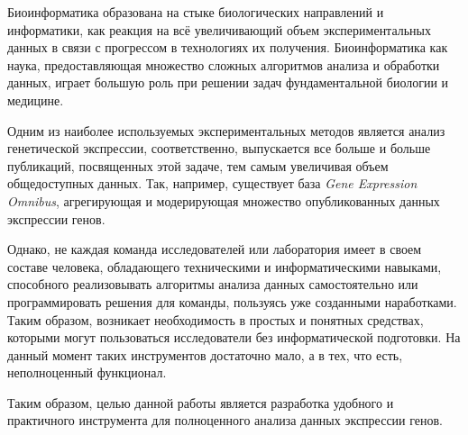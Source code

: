 \documentclass[annotation,specification]{itmo-student-thesis}
\begin{document}



\tableofcontents

\startprefacepage
Биоинформатика образована на стыке биологических направлений и информатики, как реакция на всё увеличивающий объем экспериментальных данных в связи с прогрессом в технологиях их получения. Биоинформатика как наука, предоставляющая множество сложных алгоритмов анализа и обработки данных, играет большую роль при решении задач фундаментальной биологии и медицине.

Одним из наиболее используемых экспериментальных методов является анализ генетической экспрессии, соответственно, выпускается все больше и больше публикаций, посвященных этой задаче, тем самым увеличивая объем общедоступных данных. Так, например, существует база \emph{Gene Expression Omnibus}, агрегирующая и модерирующая множество опубликованных данных экспрессии генов.

Однако, не каждая команда исследователей или лаборатория имеет в своем составе человека, обладающего техническими и информатическими навыками, способного реализовывать алгоритмы анализа данных самостоятельно или программировать решения для команды, пользуясь уже созданными наработками. Таким образом, возникает необходимость в простых и понятных средствах, которыми могут пользоваться исследователи без информатической подготовки. На данный момент таких инструментов достаточно мало, а в тех, что есть, неполноценный функционал.

Таким образом, целью данной работы является разработка удобного и практичного инструмента для полноценного анализа данных экспрессии генов.
\startrelatedwork

\finishrelatedwork


\end{document}
